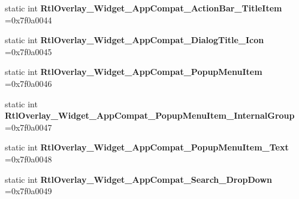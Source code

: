 \begin{DoxyCompactItemize}
\item 
\mbox{\label{classandroid_1_1support_1_1graphics_1_1drawable_1_1animated_1_1R_1_1style_a1ccfd5a91b868abc3b9360bc15e191f3}} 
static int {\bfseries Rtl\+Overlay\+\_\+\+Widget\+\_\+\+App\+Compat\+\_\+\+Action\+Bar\+\_\+\+Title\+Item} =0x7f0a0044
\item 
\mbox{\label{classandroid_1_1support_1_1graphics_1_1drawable_1_1animated_1_1R_1_1style_ab5e0365f6ac5d1b1ccb28e13889a7587}} 
static int {\bfseries Rtl\+Overlay\+\_\+\+Widget\+\_\+\+App\+Compat\+\_\+\+Dialog\+Title\+\_\+\+Icon} =0x7f0a0045
\item 
\mbox{\label{classandroid_1_1support_1_1graphics_1_1drawable_1_1animated_1_1R_1_1style_a6375a4d9bca79e4db8c1da23c0be95db}} 
static int {\bfseries Rtl\+Overlay\+\_\+\+Widget\+\_\+\+App\+Compat\+\_\+\+Popup\+Menu\+Item} =0x7f0a0046
\item 
\mbox{\label{classandroid_1_1support_1_1graphics_1_1drawable_1_1animated_1_1R_1_1style_affeb0420aec8488aaae387b53e7f8800}} 
static int {\bfseries Rtl\+Overlay\+\_\+\+Widget\+\_\+\+App\+Compat\+\_\+\+Popup\+Menu\+Item\+\_\+\+Internal\+Group} =0x7f0a0047
\item 
\mbox{\label{classandroid_1_1support_1_1graphics_1_1drawable_1_1animated_1_1R_1_1style_ad7591d53ce022156efe0c1640f508641}} 
static int {\bfseries Rtl\+Overlay\+\_\+\+Widget\+\_\+\+App\+Compat\+\_\+\+Popup\+Menu\+Item\+\_\+\+Text} =0x7f0a0048
\item 
\mbox{\label{classandroid_1_1support_1_1graphics_1_1drawable_1_1animated_1_1R_1_1style_ac8b9f5f074e7ba5496c5e38c0163fa3f}} 
static int {\bfseries Rtl\+Overlay\+\_\+\+Widget\+\_\+\+App\+Compat\+\_\+\+Search\+\_\+\+Drop\+Down} =0x7f0a0049
\item 
\mbox{\label{classandroid_1_1support_1_1graphics_1_1drawable_1_1animated_1_1R_1_1style_a0ea75d89db6921ff076d81495c023ded}} 

\end{DoxyCompactItemize}
